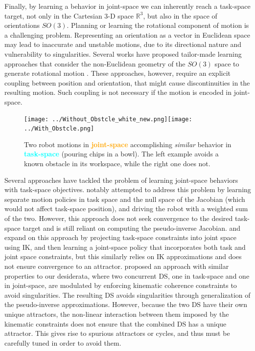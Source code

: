 \documentclass[letterpaper, 10 pt, conference,fleqn]{ieeeconf}
\begin{document}
Finally, by learning a behavior in joint-space we can inherently reach a task-space target, not only in the Cartesian 3-D space $\mathbb{R}^3$, but also in the space of orientations $SO(3)$. Planning or learning the rotational component of motion is a challenging problem. Representing an orientation as a vector in Euclidean space may lead to inaccurate and unstable motions, due to its directional nature and vulnerability to singularities. Several works have proposed tailor-made learning approaches that consider the non-Euclidean geometry of the $SO(3)$ space to generate rotational motion \cite{KIM201728} \cite{6907291} \cite{7829369}. These approaches, however, require an explicit coupling between position and orientation, that might cause discontinuities in the resulting motion. Such coupling is not necessary if the motion is encoded in joint-space. 
\begin{figure}[t]
\centering
\texttt{[image: ../Without\_Obstcle\_white\_new.png]}\texttt{[image: ../With\_Obstcle.png]}
\caption{Two robot motions in \textcolor{orange}{\textbf{joint-space}} accomplishing \textit{similar} behavior in \textcolor{cyan}{\textbf{task-space}} (pouring chips in a bowl). The left example avoids a known obstacle in its workspace, while the right one does not.}
\label{fig:robot_example}
\vspace{-20pt}
\end{figure}


Several approaches have tackled the problem of learning joint-space behaviors with task-space objectives. \cite{calinon2008probabilistic} notably attempted to address this problem by learning separate motion policies in task space and the null space of the Jacobian (which would not affect task-space position), and driving the robot with a weighted sum of the two.  However, this approach does not seek convergence to the desired task-space target and is still reliant on computing the pseudo-inverse Jacobian. \cite{calinon2010learning} and \cite{silverio2017learning} expand on this approach by projecting task-space constraints into joint space using IK, and then learning a joint-space policy that incorporates both task and joint space constraints, but this similarly relies on IK approximations and does not ensure convergence to an attractor.
\cite{hersch2008reaching} proposed an approach with similar properties to our desiderata, where two concurrent DS, one in task-space and one in joint-space, are modulated by enforcing kinematic coherence constraints to avoid singularities. The resulting DS avoids singularities through generalization of the pseudo-inverse approximations. However, because the two DS have their own unique attractors, the non-linear interaction between them imposed by the kinematic constraints does not ensure that the combined DS has a unique attractor. This gives rise to spurious attractors or cycles, and thus must be carefully tuned in order to avoid them. 
\end{document}
